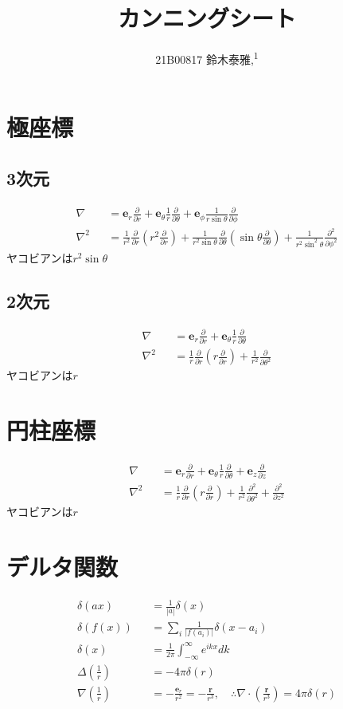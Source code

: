 \documentclass[12pt,dvipdfmx]{jsarticle}
\newcommand\authormark[1]{\textsuperscript{#1}}
\begin{document}
\title{カンニングシート}

\author{21B00817 鈴木泰雅,\authormark{1}}
\section*{\Large{極座標}}
\subsection*{3次元}
\begin{eqnarray}
  \nabla &&= \bm{e}_r \frac{\partial}{\partial r} + \bm{e}_{\theta}\frac{1}{r} \frac{\partial}{\partial\theta} + \bm{e}_{\phi}\frac{1}{r\sin\theta}\frac{\partial}{\partial \phi}\\
  \nabla^2 &&= \frac{1}{r^2}\frac{\partial}{\partial r}\left( r^2\frac{\partial}{\partial r} \right) + \frac{1}{r^2\sin\theta}\frac{\partial}{\partial\theta}\left( \sin\theta\frac{\partial}{\partial\theta} \right) + \frac{1}{r^2\sin^2\theta}\frac{\partial^2}{\partial \phi^2}
\end{eqnarray}
ヤコビアンは$r^2\sin\theta$
\subsection*{2次元}
\begin{eqnarray}
  \nabla &&= \bm{e}_r \frac{\partial}{\partial r} + \bm{e}_{\theta}\frac{1}{r} \frac{\partial}{\partial\theta}\\
  \nabla^2 &&= \frac{1}{r}\frac{\partial}{\partial r}\left( r \frac{\partial}{\partial r} \right) + \frac{1}{r^2}\frac{\partial}{\partial\theta^2}
\end{eqnarray}
ヤコビアンは$r$
\section*{\Large{円柱座標}}
\begin{eqnarray}
  \nabla &&= \bm{e}_r \frac{\partial}{\partial r} + \bm{e}_{\theta}\frac{1}{r}\frac{\partial}{\partial \theta} +\bm{e}_z \frac{\partial}{\partial z}\\
  \nabla^2 &&= \frac{1}{r}\frac{\partial}{\partial r}\left( r\frac{\partial}{\partial r} \right) + \frac{1}{r^2}\frac{\partial^2}{\partial\theta^2} + \frac{\partial^2}{\partial z^2}
\end{eqnarray}
ヤコビアンは$r$
\section*{\Large{デルタ関数}}
\begin{eqnarray}
  \delta(ax) &&= \frac{1}{|a|}\delta(x)\\
  \delta(f(x)) &&= \sum_i \frac{1}{|f(a_i)|}\delta(x-a_i)\\
  \delta(x) &&= \frac{1}{2\pi}\int_{-\infty}^{\infty} e^{ikx}dk\\
  \Delta\left( \frac{1}{r} \right) &&= -4\pi\delta(r)\\
  \nabla\left( \frac{1}{r} \right) &&= -\frac{\bm{e}_r}{r^2} = -\frac{\bm{r}}{r^3},\quad\therefore \nabla\cdot\left( \frac{\bm{r}}{r^3} \right) = 4\pi\delta(r)
\end{eqnarray}
\end{document}
